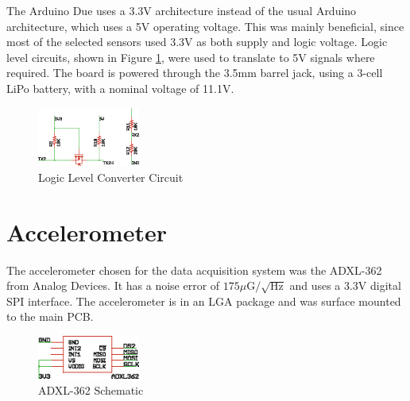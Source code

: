 The Arduino Due uses a 3.3V architecture instead of the usual Arduino architecture, which uses a 5V operating voltage. This was mainly beneficial, since most of the selected sensors used 3.3V as both supply and logic voltage. Logic level circuits, shown in Figure \ref{logicLevel}, were used to translate to 5V signals where required.  The board is powered through the 3.5mm barrel jack, using a 3-cell LiPo battery, with a nominal voltage of 11.1V.
\begin{figure}[H]
  \centering
    \includegraphics[width=0.3\textwidth]{figures/logicLevelConverterSchematic.eps}
      \caption{Logic Level Converter Circuit} \label{logicLevel}
\end{figure}

\section{Accelerometer}
The accelerometer chosen for the data acquisition system was the ADXL-362 from Analog Devices. It has a noise error of $175\mu\text{G}/\sqrt{\text{Hz}}$ and uses a 3.3V digital SPI interface\cite{adxl362DataSheet}. The accelerometer is in an LGA package and was surface mounted to the main PCB.
\begin{figure}[H]
  \centering
    \includegraphics[width=0.3\textwidth]{figures/adxl362.eps}
      \caption{ADXL-362 Schematic} \label{adxl362Schematic}
\end{figure}

